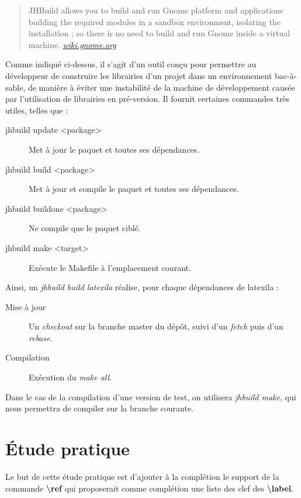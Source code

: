 \documentclass[a4paper,11pt]{report}
\begin{document}
\begin{quote}
JHBuild allows you to build and run Gnome platform and applications building the required modules in a sandbox environment, isolating the installation ; so there is no need to build and run Gnome inside a virtual machine. \textit{\url{wiki.gnome.org}}
\end{quote}

Comme indiqué ci-dessus, il s'agit d'un outil conçu pour permettre au développeur de construire les librairies d'un projet dans un environnement bac-à-sable, de manière à éviter une instabilité de la machine de développement causée par l'utilisation de librairies en pré-version.
Il fournit certaines commandes très utiles, telles que :

\begin{description}
  \item[jhbuild update <package>] Met à jour le paquet et toutes ses dépendances.
  \item[jhbuild build <package>] Met à jour et compile le paquet et toutes ses dépendances.
  \item[jhbuild buildone <package>] Ne compile que le paquet ciblé.
  \item[jhbuild make <target>] Exécute le Makefile à l'emplacement courant.
\end{description}

Ainsi, un \textit{jhbuild build latexila} réalise, pour chaque dépendances de latexila :

\begin{description} 
  \item[Mise à jour] Un \textit{checkout} sur la branche master du dépôt, suivi d'un \textit{fetch} puis d'un \textit{rebase}.
  \item[Compilation] Exécution du \textit{make all}.
\end{description}

Dans le cas de la compilation d'une version de test, on utilisera \textit{jhbuild make}, qui nous permettra de compiler sur la branche courante.

\chapter*{Étude pratique} %
\label{cha:etude_pratique}
Le but de cette étude pratique est d'ajouter à la complétion le support de la commande \textbf{\textbackslash{}ref} qui proposerait comme complétion une liste des clef des \textbf{\textbackslash{}label}.
\end{document}
